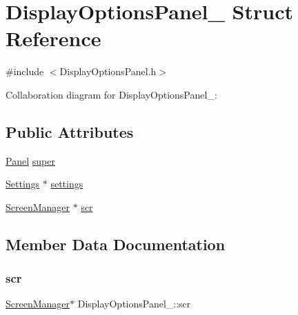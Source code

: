 \hypertarget{structDisplayOptionsPanel__}{}\section{Display\+Options\+Panel\+\_\+ Struct Reference}
\label{structDisplayOptionsPanel__}


{\ttfamily \#include $<$Display\+Options\+Panel.\+h$>$}



Collaboration diagram for Display\+Options\+Panel\+\_\+\+:
\subsection*{Public Attributes}
\begin{DoxyCompactItemize}
\item 
\hyperlink{Panel_8h_a034d4c16521db412dc7a1e8536d16fae}{Panel} \hyperlink{structDisplayOptionsPanel___aee633961cf454121dbfcf8d44dee3882}{super}
\item 
\hyperlink{Settings_8h_ad97e5960b63f21c02bf5e0e43c0ef002}{Settings} $\ast$ \hyperlink{structDisplayOptionsPanel___a0c89056c452890dcf365b75a58a5a8c0}{settings}
\item 
\hyperlink{ScreenManager_8h_a798c9c69dc8024a4c6829982bf94dddd}{Screen\+Manager} $\ast$ \hyperlink{structDisplayOptionsPanel___ab0b82e593b96562ced96e8a55c42f718}{scr}
\end{DoxyCompactItemize}


\subsection{Member Data Documentation}
\mbox{\label{structDisplayOptionsPanel___ab0b82e593b96562ced96e8a55c42f718}} 
\subsubsection{\texorpdfstring{scr}{scr}}
{\footnotesize\ttfamily \hyperlink{ScreenManager_8h_a798c9c69dc8024a4c6829982bf94dddd}{Screen\+Manager}$\ast$ Display\+Options\+Panel\+\_\+\+::scr}

\mbox{\label{structDisplayOptionsPanel___a0c89056c452890dcf365b75a58a5a8c0}} 
